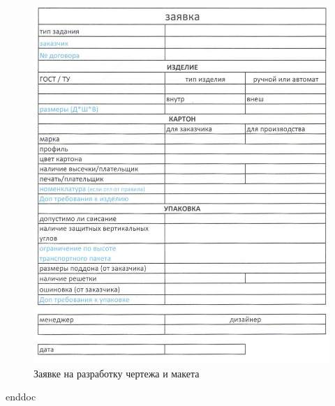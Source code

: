 \begin{figure}
\begin{center}
 \includegraphics[width=\linewidth, height=0.94\textheight, keepaspectratio]{Pics/f16.jpg}
\end{center}
\caption{Заявке на разработку чертежа и макета}
\label{pic:f16}
\end{figure}


\clearpage
 {enddoc}